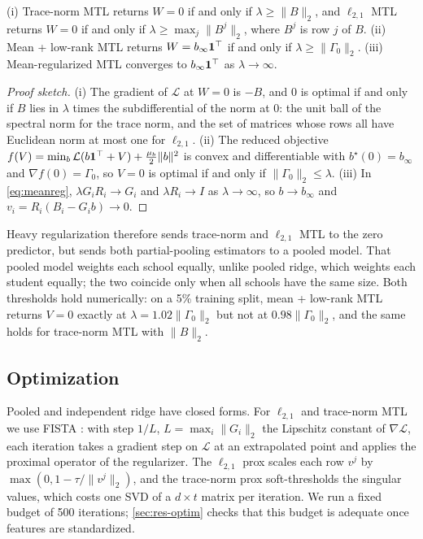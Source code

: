 \begin{proposition}
\label{prop:limits}
(i) Trace-norm MTL returns $W = 0$ if and only if $\lambda \geq \lVert B \rVert_2$, and $\ell_{2,1}$ MTL returns $W = 0$ if and only if $\lambda \geq \max_j \lVert B^{j} \rVert_2$, where $B^{j}$ is row $j$ of $B$.
(ii) Mean + low-rank MTL returns $W = b_\infty \mathbf{1}^\top$ if and only if $\lambda \geq \lVert \Gamma_0 \rVert_2$.
(iii) Mean-regularized MTL converges to $b_\infty \mathbf{1}^\top$ as $\lambda \to \infty$.
\end{proposition}

\begin{proof}[Proof sketch]
(i) The gradient of $\mathcal{L}$ at $W = 0$ is $-B$, and $0$ is optimal if and only if $B$ lies in $\lambda$ times the subdifferential of the norm at $0$: the unit ball of the spectral norm for the trace norm, and the set of matrices whose rows all have Euclidean norm at most one for $\ell_{2,1}$. (ii) The reduced objective $f(V) = \min_b \mathcal{L}(b\mathbf{1}^\top + V) + \frac{\mu_b}{2}\lVert b \rVert^2$ is convex and differentiable with $b^\star(0) = b_\infty$ and $\nabla f(0) = \Gamma_0$, so $V = 0$ is optimal if and only if $\lVert \Gamma_0 \rVert_2 \leq \lambda$. (iii) In \eqref{eq:meanreg}, $\lambda G_i R_i \to G_i$ and $\lambda R_i \to I$ as $\lambda \to \infty$, so $b \to b_\infty$ and $v_i = R_i (B_i - G_i b) \to 0$.
\end{proof}

Heavy regularization therefore sends trace-norm and $\ell_{2,1}$ MTL to the zero predictor, but sends both partial-pooling estimators to a pooled model. That pooled model weights each school equally, unlike pooled ridge, which weights each student equally; the two coincide only when all schools have the same size. Both thresholds hold numerically: on a 5\% training split, mean + low-rank MTL returns $V = 0$ exactly at $\lambda = 1.02\lVert \Gamma_0 \rVert_2$ but not at $0.98\lVert \Gamma_0 \rVert_2$, and the same holds for trace-norm MTL with $\lVert B \rVert_2$.

\subsection{Optimization}
\label{sec:optim}
Pooled and independent ridge have closed forms. For $\ell_{2,1}$ and trace-norm MTL we use FISTA \citep{beck2009fista}: with step $1/L$, $L = \max_i \lVert G_i \rVert_2$ the Lipschitz constant of $\nabla \mathcal{L}$, each iteration takes a gradient step on $\mathcal{L}$ at an extrapolated point and applies the proximal operator of the regularizer. The $\ell_{2,1}$ prox scales each row $v^j$ by $\max(0, 1 - \tau / \lVert v^j \rVert_2)$, and the trace-norm prox soft-thresholds the singular values, which costs one SVD of a $d \times t$ matrix per iteration. We run a fixed budget of 500 iterations; \cref{sec:res-optim} checks that this budget is adequate once features are standardized.

